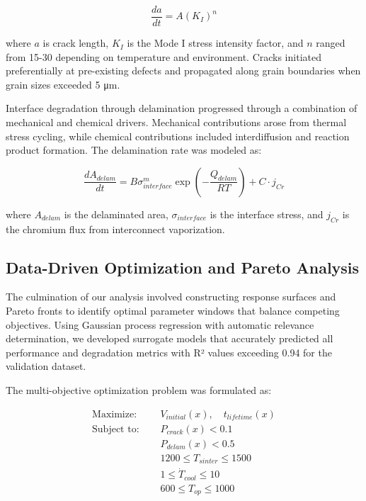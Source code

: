 \documentclass[conference]{IEEEtran}
\begin{document}
\begin{equation}
\frac{da}{dt} = A(K_I)^n
\end{equation}

where $a$ is crack length, $K_I$ is the Mode I stress intensity factor, and $n$ ranged from 15-30 depending on temperature and environment. Cracks initiated preferentially at pre-existing defects and propagated along grain boundaries when grain sizes exceeded 5 μm.

Interface degradation through delamination progressed through a combination of mechanical and chemical drivers. Mechanical contributions arose from thermal stress cycling, while chemical contributions included interdiffusion and reaction product formation. The delamination rate was modeled as:

\begin{equation}
\frac{dA_{delam}}{dt} = B\sigma_{interface}^m \exp\left(-\frac{Q_{delam}}{RT}\right) + C \cdot j_{Cr}
\end{equation}

where $A_{delam}$ is the delaminated area, $\sigma_{interface}$ is the interface stress, and $j_{Cr}$ is the chromium flux from interconnect vaporization.

\subsection{Data-Driven Optimization and Pareto Analysis}

The culmination of our analysis involved constructing response surfaces and Pareto fronts to identify optimal parameter windows that balance competing objectives. Using Gaussian process regression with automatic relevance determination, we developed surrogate models that accurately predicted all performance and degradation metrics with R² values exceeding 0.94 for the validation dataset.

The multi-objective optimization problem was formulated as:

\begin{align}
\text{Maximize: } & \quad V_{initial}(x), \quad t_{lifetime}(x) \\
\text{Subject to: } & \quad P_{crack}(x) < 0.1 \\
& \quad P_{delam}(x) < 0.5 \\
& \quad 1200 \leq T_{sinter} \leq 1500 \\
& \quad 1 \leq \dot{T}_{cool} \leq 10 \\
& \quad 600 \leq T_{op} \leq 1000
\end{align}
\end{document}

